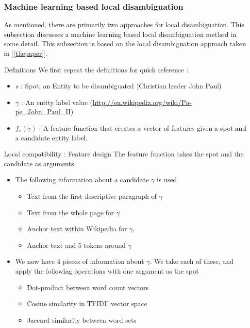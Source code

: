 \subsubsection{Machine learning based local disambiguation}
As mentioned, there are primarily two approaches for local disambiguation. 
This subsection discusses a machine learning based local disambiguation method in some detail. This subsection
is based on the local disambiguation approach taken in [\ref{thepaper}].
\par{Definitions}
We first repeat the definitions for quick reference : 
\begin{itemize}
  \item $s$ : Spot, an Entity to be disambiguated (Christian leader John Paul) \bigskip 
  \item $\gamma$ : An entity label value (\url{http://en.wikipedia.org/wiki/Po-pe_John_Paul_II})  \bigskip 
 \item $f_s(\gamma)$ : A feature function that creates a vector of features given a spot and a candidate entity label.
 \end{itemize}
 
 \par{Local compatibility : Feature design} 
 The feature function takes the spot and the candidate as arguments. 
 
\begin{itemize} 
 
 \item The following information about a candidate $\gamma$ is used
\begin{itemize} 
 \item Text from the first descriptive paragraph of $\gamma$
  \item Text from the whole page for $\gamma$
  \item Anchor text within Wikipedia for $\gamma$.
  \item Anchor text and 5 tokens around $\gamma$ 
 \end{itemize}
 
 \item We now have 4 pieces of information about $\gamma$. We take each of these, and apply the following operations with 
 one argument as the spot
    \begin{itemize}
      \item{Dot-product between word count vectors}
      \item{Cosine similarity in TFIDF vector space}
      \item{Jaccard similarity between word sets}
  \end{itemize} 
  \end{itemize} 
 
